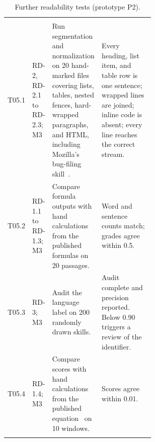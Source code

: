 \begin{singlespace}
\setlength{\LTcapwidth}{\linewidth}
\begin{longtable}{@{}L{0.09\linewidth} L{0.13\linewidth} L{\tabcolsep\relax} L{0.36\linewidth}@{}}
\caption{Further readability tests (prototype P2).}\label{tab:readability-tests-more}\\
 &  &  & \\
\midrule
\endfirsthead
{}
 &  &  & \\
\midrule
\endhead
\bottomrule
\endfoot
T05.1 & RD-2, RD-2.1 to RD-2.3; M3 & Run segmentation and normalization on 20 hand-marked files covering lists, tables, nested fences, hard-wrapped paragraphs, and HTML, including Mozilla's bug-filing skill~\cite{mozilla2026bugfiling}. & Every heading, list item, and table row is one sentence; wrapped lines are joined; inline code is absent; every line reaches the correct stream.\\
\addlinespace[3pt]
T05.2 & RD-1.1 to RD-1.3; M3 & Compare formula outputs with hand calculations from the published formulas on 20 passages. & Word and sentence counts match; grades agree within 0.5.\\
\addlinespace[3pt]
T05.3 & RD-3; M3 & Audit the language label on 200 randomly drawn skills. & Audit complete and precision reported. Below 0.90 triggers a review of the identifier.\\
\addlinespace[3pt]
T05.4 & RD-1.4; M3 & Compare scores with hand calculations from the published equation~\cite{posnett2011simpler} on 10 windows. & Scores agree within 0.01.\\
\addlinespace[3pt]
\end{longtable}
\end{singlespace}

\clearpage
{}\label{app:readability-pilot}

